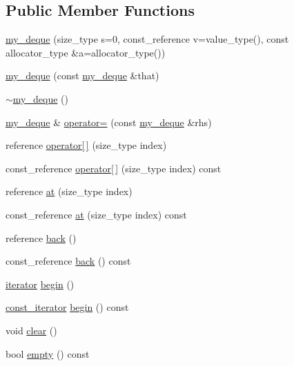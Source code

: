 \subsection*{Public Member Functions}
\begin{DoxyCompactItemize}
\item 
\hyperlink{classmy__deque_ae2ea938564caad3aa8be5b9c647bea4a}{my\-\_\-deque} (size\-\_\-type s=0, const\-\_\-reference v=value\-\_\-type(), const allocator\-\_\-type \&a=allocator\-\_\-type())
\item 
\hyperlink{classmy__deque_a59015bc46e6096555d631d69dc8fd7e7}{my\-\_\-deque} (const \hyperlink{classmy__deque}{my\-\_\-deque} \&that)
\item 
\hyperlink{classmy__deque_ae22194ee436865a59a7475c339a9c1ca}{$\sim$my\-\_\-deque} ()
\item 
\hyperlink{classmy__deque}{my\-\_\-deque} \& \hyperlink{classmy__deque_aaa103f2058854bb98e500de6305b1564}{operator=} (const \hyperlink{classmy__deque}{my\-\_\-deque} \&rhs)
\item 
reference \hyperlink{classmy__deque_a489b77decf4d424f43092e194d69444f}{operator\mbox{[}$\,$\mbox{]}} (size\-\_\-type index)
\item 
const\-\_\-reference \hyperlink{classmy__deque_ad79fcd9e94dfc5566e1cd0ce606cf208}{operator\mbox{[}$\,$\mbox{]}} (size\-\_\-type index) const 
\item 
reference \hyperlink{classmy__deque_a75106748e6ff8735e40560e7335bd500}{at} (size\-\_\-type index)
\item 
const\-\_\-reference \hyperlink{classmy__deque_a9642816a10e6a6ee1f8a5367987b8ee8}{at} (size\-\_\-type index) const 
\item 
reference \hyperlink{classmy__deque_a1d9aadb5bedc29da86d4323587cd5e4d}{back} ()
\item 
const\-\_\-reference \hyperlink{classmy__deque_ac273f9574a95af619b9f0dcc0d2e89d0}{back} () const 
\item 
\hyperlink{classmy__deque_1_1iterator}{iterator} \hyperlink{classmy__deque_aef8cac69d47cb1c274896b82ba8f453a}{begin} ()
\item 
\hyperlink{classmy__deque_1_1const__iterator}{const\-\_\-iterator} \hyperlink{classmy__deque_a8612539eff4ee446f85ffb30abf91a69}{begin} () const 
\item 
void \hyperlink{classmy__deque_aa29f90c63cde532f5fc169e8e66b514c}{clear} ()
\item 
bool \hyperlink{classmy__deque_a2b4f029c47afbdbf057639c5a6816d6c}{empty} () const 
\item 

\end{DoxyCompactItemize}
